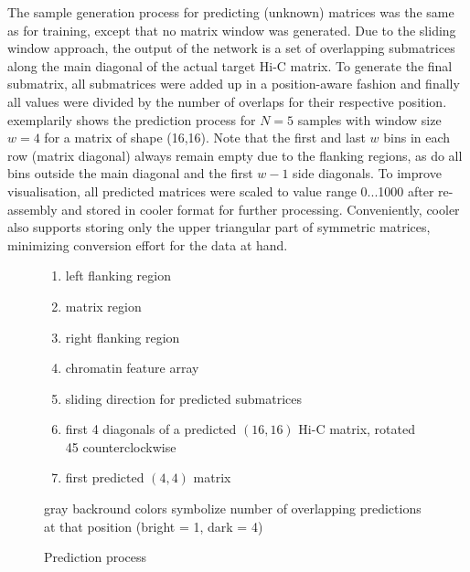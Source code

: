 The sample generation process for predicting (unknown) matrices was the same as for training,
except that no matrix window was generated.
Due to the sliding window approach, the output of the network is a set of overlapping submatrices along the main diagonal of the actual target Hi-C matrix.
To generate the final submatrix, all submatrices were added up in a position-aware fashion 
and finally all values were divided by the number of overlaps for their respective position.
 exemplarily shows the prediction process for $N=5$ samples with window size $w=4$ for a matrix of shape (16,16).
Note that the first and last $w$ bins in each row (matrix diagonal) always remain empty due to the flanking regions,
as do all bins outside the main diagonal and the first $w-1$ side diagonals.
To improve visualisation, all predicted matrices were scaled to value range 0...1000 after re-assembly and stored in cooler format for further processing.
Conveniently, cooler also supports storing only the upper triangular part of symmetric matrices, minimizing conversion effort for the data at hand.

\begin{figure}
 \begin{minipage}{0.65\textwidth}
    \caption{Prediction process}
    \label{fig:methods:prediction}
 \end{minipage}\hfill
 \begin{minipage}{0.3\textwidth}
 \scriptsize
  \begin{enumerate}[label=\Alph*:,leftmargin=*]
   \raggedright
    \item left flanking region
    \item matrix region
    \item right flanking region
    \item chromatin feature array
    \item sliding direction for predicted submatrices
    \item first 4 diagonals of a predicted $(16, 16)$ Hi-C matrix, rotated \SI{45}{\deg} counterclockwise
    \item first predicted $(4, 4)$ matrix
\end{enumerate}
\raggedright{gray backround colors symbolize number of overlapping predictions at that position (bright = 1, dark = 4)}
 \end{minipage}
\end{figure}

